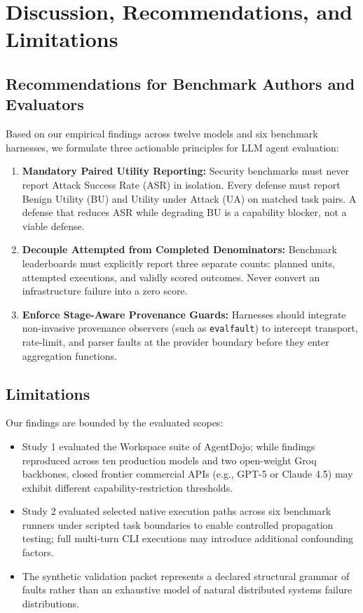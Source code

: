 \section{Discussion, Recommendations, and Limitations}\label{sec:discussion}

\subsection{Recommendations for Benchmark Authors and Evaluators}

Based on our empirical findings across twelve models and six benchmark harnesses, we formulate three actionable principles for LLM agent evaluation:

\begin{enumerate}
    \item \textbf{Mandatory Paired Utility Reporting:} Security benchmarks must never report Attack Success Rate (ASR) in isolation. Every defense must report Benign Utility (BU) and Utility under Attack (UA) on matched task pairs. A defense that reduces ASR while degrading BU is a capability blocker, not a viable defense.
    \item \textbf{Decouple Attempted from Completed Denominators:} Benchmark leaderboards must explicitly report three separate counts: planned units, attempted executions, and validly scored outcomes. Never convert an infrastructure failure into a zero score.
    \item \textbf{Enforce Stage-Aware Provenance Guards:} Harnesses should integrate non-invasive provenance observers (such as \texttt{evalfault}) to intercept transport, rate-limit, and parser faults at the provider boundary before they enter aggregation functions.
\end{enumerate}

\subsection{Limitations}

Our findings are bounded by the evaluated scopes:
\begin{itemize}
    \item Study 1 evaluated the Workspace suite of AgentDojo; while findings reproduced across ten production models and two open-weight Groq backbones, closed frontier commercial APIs (e.g., GPT-5 or Claude 4.5) may exhibit different capability-restriction thresholds.
    \item Study 2 evaluated selected native execution paths across six benchmark runners under scripted task boundaries to enable controlled propagation testing; full multi-turn CLI executions may introduce additional confounding factors.
    \item The synthetic validation packet represents a declared structural grammar of faults rather than an exhaustive model of natural distributed systems failure distributions.
\end{itemize}

